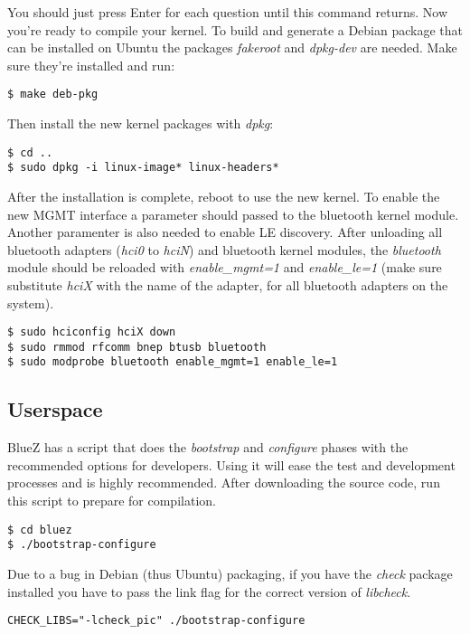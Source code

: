 \documentclass[11pt]{article}
\begin{document}
You should just press Enter for each question until this command returns. Now
you're ready to compile your kernel. To build and generate a Debian package
that can be installed on Ubuntu the packages {\em fakeroot} and {\em dpkg-dev}
are needed.  Make sure they're installed and run:

\begin{verbatim}
$ make deb-pkg
\end{verbatim}

Then install the new kernel packages with {\em dpkg}:

\begin{verbatim}
$ cd ..
$ sudo dpkg -i linux-image* linux-headers*
\end{verbatim}

After the installation is complete, reboot to use the new kernel. To enable the
new MGMT interface a parameter should passed to the bluetooth kernel module.
Another paramenter is also needed to enable LE discovery.  After unloading all
bluetooth adapters ({\em hci0} to {\em hciN}) and bluetooth kernel modules, the
{\em bluetooth} module should be reloaded with {\em enable\_mgmt=1} and {\em
enable\_le=1} (make sure substitute {\em hciX} with the name of the adapter,
for all bluetooth adapters on the system).

\begin{verbatim}
$ sudo hciconfig hciX down
$ sudo rmmod rfcomm bnep btusb bluetooth
$ sudo modprobe bluetooth enable_mgmt=1 enable_le=1
\end{verbatim}

\subsection{Userspace}

BlueZ has a script that does the {\em bootstrap} and {\em configure} phases
with the recommended options for developers. Using it will ease the test and
development processes and is highly recommended. After downloading the source
code, run this script to prepare for compilation.

\begin{verbatim}
$ cd bluez
$ ./bootstrap-configure
\end{verbatim}

Due to a bug in Debian (thus Ubuntu) packaging, if you have the {\em check}
package installed you have to pass the link flag for the correct version of
{\em libcheck}.

\begin{verbatim}
CHECK_LIBS="-lcheck_pic" ./bootstrap-configure
\end{verbatim}
\end{document}
